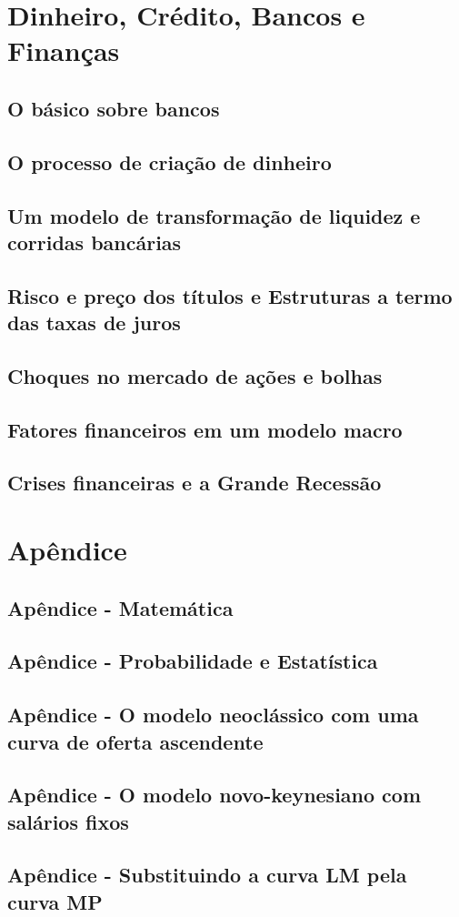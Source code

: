 \documentclass[a4paper,11pt]{book}
\theoremstyle{definition}
\begin{document}
\part{Dinheiro, Crédito, Bancos e Finanças}

\chapter{O básico sobre bancos}
\chapter{O processo de criação de dinheiro}
\chapter{Um modelo de transformação de liquidez e corridas bancárias}
\chapter{Risco e preço dos títulos e Estruturas a termo das taxas de juros}
\chapter{Choques no mercado de ações e bolhas}
\chapter{Fatores financeiros em um modelo macro}
\chapter{Crises financeiras e a Grande Recessão}

\part{Apêndice}

\chapter{Apêndice - Matemática}
\chapter{Apêndice - Probabilidade e Estatística}
\chapter{Apêndice - O modelo neoclássico com uma curva de oferta ascendente}
\chapter{Apêndice - O modelo novo-keynesiano com salários fixos}
\chapter{Apêndice - Substituindo a curva LM pela curva MP}
\end{document}
